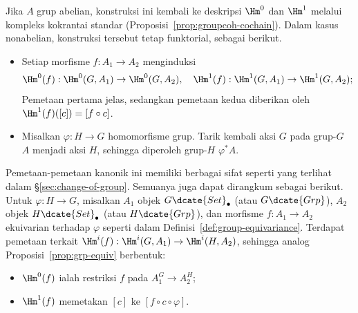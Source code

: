 Jika $A$ grup abelian, konstruksi ini kembali ke deskripsi $\Hm^0$ dan
$\Hm^1$ melalui kompleks kokrantai standar
(Proposisi~\ref{prop:groupcoh-cochain}). Dalam kasus nonabelian,
konstruksi tersebut tetap funktorial, sebagai berikut.
\begin{itemize}
	\item Setiap morfisme $f:A_1\to A_2$ menginduksi
	\begin{gather*}
		\Hm^0(f): \Hm^0(G, A_1) \to \Hm^0(G, A_2), \quad
		\Hm^1(f): \Hm^1(G, A_1) \to \Hm^1(G, A_2);
	\end{gather*}
	Pemetaan pertama jelas, sedangkan pemetaan kedua diberikan oleh
	$\Hm^1(f)([c])=[f\circ c]$.
	
	\item Misalkan $\varphi:H\to G$ homomorfisme grup. Tarik kembali aksi $G$
	pada grup-$G$ $A$ menjadi aksi $H$, sehingga diperoleh grup-$H$
	$\varphi^*A$.
\end{itemize}

Pemetaan-pemetaan kanonik ini memiliki berbagai sifat seperti yang terlihat
dalam \S\ref{sec:change-of-group}. Semuanya juga dapat dirangkum sebagai
berikut. Untuk $\varphi:H\to G$, misalkan $A_1$ objek
$G\dcate{Set}_\bullet$ (atau $G\dcate{Grp}$), $A_2$ objek
$H\dcate{Set}_\bullet$ (atau $H\dcate{Grp}$), dan morfisme $f:A_1\to A_2$
ekuivarian terhadap $\varphi$ seperti dalam
Definisi~\ref{def:group-equivariance}. Terdapat pemetaan terkait
$\Hm^i(f):\Hm^i(G,A_1)\to\Hm^i(H,A_2)$, sehingga analog
Proposisi~\ref{prop:grp-equiv} berbentuk:
\begin{itemize}
	\item $\Hm^0(f)$ ialah restriksi $f$ pada $A_1^G\to A_2^H$;
	\item $\Hm^1(f)$ memetakan $[c]$ ke $[f\circ c\circ\varphi]$.
\end{itemize}

